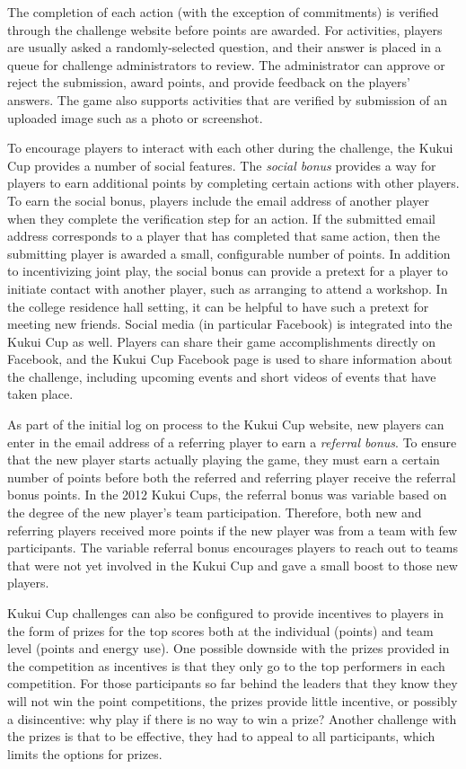 \documentclass[10pt, conference, compsocconf]{IEEEtran-old}
\begin{document}
The completion of each action (with the exception of commitments) is verified through the challenge website before points are awarded. For activities, players are usually asked a randomly-selected question, and their answer is placed in a queue for challenge administrators to review. The administrator can approve or reject the submission, award points, and provide feedback on the players' answers. The game also supports activities that are verified by submission of an uploaded image such as a photo or screenshot.

To encourage players to interact with each other during the challenge, the Kukui Cup provides a number of social features. The \emph{social bonus} provides a way for players to earn additional points by completing certain actions with other players. To earn the social bonus, players include the email address of another player when they complete the verification step for an action. If the submitted email address corresponds to a player that has completed that same action, then the submitting player is awarded a small, configurable number of points. In addition to incentivizing joint play, the social bonus can provide a pretext for a player to initiate contact with another player, such as arranging to attend a workshop. In the college residence hall setting, it can be helpful to have such a pretext for meeting new friends. Social media (in particular Facebook) is integrated into the Kukui Cup as well. Players can share their game accomplishments directly on Facebook, and the Kukui Cup Facebook page is used to share information about the challenge, including upcoming events and short videos of events that have taken place.

As part of the initial log on process to the Kukui Cup website, new players can enter in the email address of a referring player to earn a \emph{referral bonus}. To ensure that the new player starts actually playing the game, they must earn a certain number of points before both the referred and referring player receive the referral bonus points. In the 2012 Kukui Cups, the referral bonus was variable based on the degree of the new player's team participation. Therefore, both new and referring players received more points if the new player was from a team with few participants. The variable referral bonus encourages players to reach out to teams that were not yet involved in the Kukui Cup and gave a small boost to those new players.

Kukui Cup challenges can also be configured to provide incentives to players in the form of prizes for the top scores both at the individual (points) and team level (points and energy use). One possible downside with the prizes provided in the competition as incentives is that they only go to the top performers in each competition. For those participants so far behind the leaders that they know they will not win the point competitions, the prizes provide little incentive, or possibly a disincentive: why play if there is no way to win a prize? Another challenge with the prizes is that to be effective, they had to appeal to all participants, which limits the options for prizes.
\end{document}
